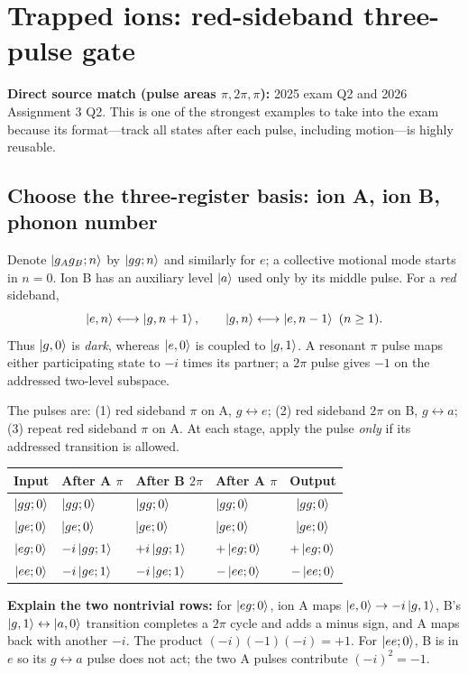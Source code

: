\section{Trapped ions: red-sideband three-pulse gate}\label{sec:ionsol}
\textbf{Direct source match (pulse areas $\pi,2\pi,\pi$):} 2025 exam Q2 and 2026 Assignment 3 Q2. This is one of the strongest examples to take into the exam because its format---track all states after each pulse, including motion---is highly reusable.

\subsection{Choose the three-register basis: ion A, ion B, phonon number}
Denote $\left\lvert g_Ag_B;n\right\rangle$ by $\left\lvert gg;n\right\rangle$ and similarly for $e$; a collective motional mode starts in $n=0$. Ion B has an auxiliary level $\left\lvert a\right\rangle$ used only by its middle pulse. For a \emph{red} sideband,
\begin{equation}
\left\lvert e,n\right\rangle\longleftrightarrow\left\lvert g,n+1\right\rangle,\qquad
\left\lvert g,n\right\rangle\longleftrightarrow\left\lvert e,n-1\right\rangle\ (n\ge1).
\end{equation}
Thus $\left\lvert g,0\right\rangle$ is \emph{dark}, whereas $\left\lvert e,0\right\rangle$ is coupled to $\left\lvert g,1\right\rangle$. A resonant $\pi$ pulse maps either participating state to $-i$ times its partner; a $2\pi$ pulse gives $-1$ on the addressed two-level subspace.

The pulses are: (1) red sideband $\pi$ on A, $g\leftrightarrow e$; (2) red sideband $2\pi$ on B, $g\leftrightarrow a$; (3) repeat red sideband $\pi$ on A. At each stage, apply the pulse \emph{only} if its addressed transition is allowed.

\begin{center}
\small
\renewcommand{\arraystretch}{1.17}
\begin{tabularx}{\linewidth}{@{}cXXXc@{}}\toprule
Input&After A $\pi$&After B $2\pi$&After A $\pi$&Output\\\midrule
$\left\lvert gg;0\right\rangle$&$\left\lvert gg;0\right\rangle$&$\left\lvert gg;0\right\rangle$&$\left\lvert gg;0\right\rangle$&$\left\lvert gg;0\right\rangle$\\
$\left\lvert ge;0\right\rangle$&$\left\lvert ge;0\right\rangle$&$\left\lvert ge;0\right\rangle$&$\left\lvert ge;0\right\rangle$&$\left\lvert ge;0\right\rangle$\\
$\left\lvert eg;0\right\rangle$&$-i\left\lvert gg;1\right\rangle$&$+i\left\lvert gg;1\right\rangle$&$+\left\lvert eg;0\right\rangle$&$+\left\lvert eg;0\right\rangle$\\
$\left\lvert ee;0\right\rangle$&$-i\left\lvert ge;1\right\rangle$&$-i\left\lvert ge;1\right\rangle$&$-\left\lvert ee;0\right\rangle$&$-\left\lvert ee;0\right\rangle$\\\bottomrule
\end{tabularx}
\end{center}
\textbf{Explain the two nontrivial rows:} for $\left\lvert eg;0\right\rangle$, ion A maps $\left\lvert e,0\right\rangle\to-i\left\lvert g,1\right\rangle$, B's $\left\lvert g,1\right\rangle\leftrightarrow\left\lvert a,0\right\rangle$ transition completes a $2\pi$ cycle and adds a minus sign, and A maps back with another $-i$. The product $(-i)(-1)(-i)=+1$. For $\left\lvert ee;0\right\rangle$, B is in $e$ so its $g\leftrightarrow a$ pulse does not act; the two A pulses contribute $(-i)^2=-1$.

